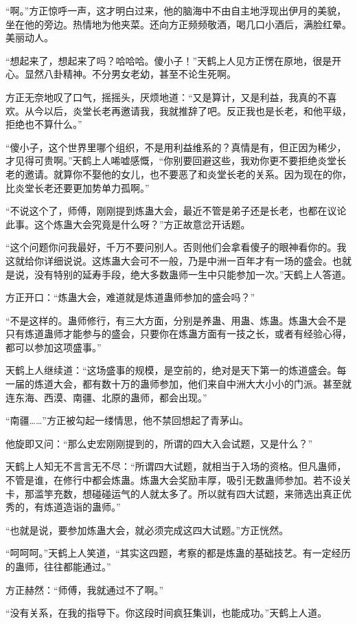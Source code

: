 \begin{this_body}
“啊。”方正惊呼一声，这才明白过来，他的脑海中不由自主地浮现出伊月的美貌，坐在他的旁边。热情地为他夹菜。还向方正频频敬酒，喝几口小酒后，满脸红晕。美丽动人。

“想起来了，想起来了吗？哈哈哈。傻小子！”天鹤上人见方正愣在原地，很是开心。显然八卦精神。不分男女老幼，甚至不论生死啊。

方正无奈地叹了口气，摇摇头，厌烦地道：“又是算计，又是利益，我真的不喜欢。从今以后，炎堂长老再邀请我，我就推辞了吧。反正我也是长老，和他平级，拒绝也不算什么。”

“傻小子，这个世界里哪个组织，不是用利益维系的？真情是有，但正因为稀少，才见得可贵啊。”天鹤上人唏嘘感慨，“你别要回避这些，我劝你更不要拒绝炎堂长老的邀请。就算你不娶他的女儿，也不要恶了和炎堂长老的关系。因为现在的你，比炎堂长老还要更加势单力孤啊。”

“不说这个了，师傅，刚刚提到炼蛊大会，最近不管是弟子还是长老，也都在议论此事。这个炼蛊大会究竟是什么呀？”方正故意岔开话题。

“这个问题你问我最好，千万不要问别人。否则他们会拿看傻子的眼神看你的。我这就给你详细说说。这炼蛊大会可不一般，乃是中洲一百年才有一场的盛会。也就是说，没有特别的延寿手段，绝大多数蛊师一生中只能参加一次。”天鹤上人答道。

方正开口：“炼蛊大会，难道就是炼道蛊师参加的盛会吗？”

“不是这样的。蛊师修行，有三大方面，分别是养蛊、用蛊、炼蛊。炼蛊大会不是只有炼道蛊师才能参与的盛会，只要你在炼蛊方面有一技之长，或者有经验心得，都可以参加这项盛事。”

天鹤上人继续道：“这场盛事的规模，是空前的，绝对是天下第一的炼道盛会。每一届的炼道大会，都有数十万的蛊师参加，他们来自中洲大大小小的门派。甚至就连东海、西漠、南疆、北原的蛊师，都会出现。”

“南疆……”方正被勾起一缕情思，他不禁回想起了青茅山。

他旋即又问：“那么史宏刚刚提到的，所谓的四大入会试题，又是什么？”

天鹤上人知无不言言无不尽：“所谓四大试题，就相当于入场的资格。但凡蛊师，不管是谁，在修行中都会炼蛊。炼蛊大会奖励丰厚，吸引无数蛊师参加。若不设关卡，那滥竽充数，想碰碰运气的人就太多了。所以就有四大试题，来筛选出真正优秀的，有炼道造诣的蛊师。”

“也就是说，要参加炼蛊大会，就必须完成这四大试题。”方正恍然。

“呵呵呵。”天鹤上人笑道，“其实这四题，考察的都是炼蛊的基础技艺。有一定经历的蛊师，往往都能通过。”

方正赫然：“师傅，我就通过不了啊。”

“没有关系，在我的指导下。你这段时间疯狂集训，也能成功。”天鹤上人道。


\end{this_body}

